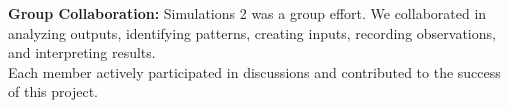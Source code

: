 \documentclass{article}
\begin{document}
\textbf{Group Collaboration:} 
Simulations 2 was a group effort. We collaborated in analyzing outputs, identifying patterns, creating inputs, recording observations, and interpreting results. \\
Each member actively participated in discussions and contributed to the success of this project.


\end{document}

